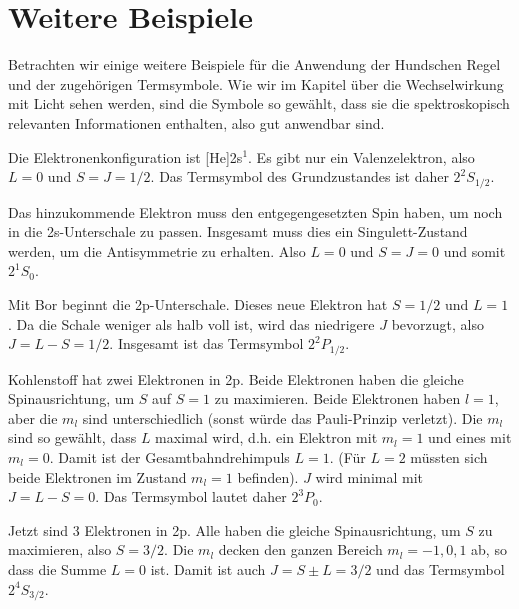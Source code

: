 \section{Weitere Beispiele}

Betrachten wir einige weitere Beispiele für die Anwendung der Hundschen Regel und der zugehörigen Termsymbole. Wie wir im Kapitel über die Wechselwirkung mit Licht sehen werden, sind die Symbole so gewählt, dass sie die spektroskopisch relevanten Informationen enthalten, also gut anwendbar sind.

\begin{description}\setlength{\itemsep}{0pt}

    \item[Lithium] Die Elektronenkonfiguration ist [He]2s$^1$. Es gibt nur ein Valenzelektron, also $L=0$ und $S=J=1/2$. Das Termsymbol des Grundzustandes ist daher $2^2S_{1/2}$.
    
    \item[Berillim] Das hinzukommende Elektron muss den entgegengesetzten Spin haben, um noch in die 2s-Unterschale zu passen. Insgesamt muss dies ein Singulett-Zustand werden, um die Antisymmetrie zu erhalten. Also $L=0$ und $S=J=0$ und somit $2^1S_0$.
    
    \item[Bor] Mit Bor beginnt die 2p-Unterschale. Dieses neue Elektron hat $S=1/2$ und $L=1$. Da die Schale weniger als halb voll ist, wird das niedrigere $J$ bevorzugt, also $J=L-S = 1/2$. Insgesamt ist das Termsymbol $2^2P_{1/2}$.
    
    \item[Kohelnstoff] Kohlenstoff hat zwei Elektronen in 2p. Beide Elektronen haben die gleiche Spinausrichtung, um $S$ auf $S=1$ zu maximieren. Beide Elektronen haben $l=1$, aber die $m_l$ sind unterschiedlich (sonst würde das Pauli-Prinzip verletzt). Die $m_l$ sind so gewählt, dass $L$ maximal wird, d.h. ein Elektron mit $m_l=1$ und eines mit $m_l=0$. Damit ist der Gesamtbahndrehimpuls $L=1$. (Für $L=2$ müssten sich beide Elektronen im Zustand $m_l = 1$ befinden). $J$ wird minimal mit $J=L-S =0$. Das Termsymbol lautet daher $2^3P_0$.
    
    \item[Stickstoff] Jetzt sind 3 Elektronen in 2p. Alle haben die gleiche Spinausrichtung, um $S$ zu maximieren, also $S=3/2$. Die $m_l$ decken den ganzen Bereich $m_l = -1, 0, 1$ ab, so dass die Summe $L= 0$ ist. Damit ist auch $J = S \pm L = 3/2$ und das Termsymbol $2^4S_{3/2}$.
    

\end{description}
